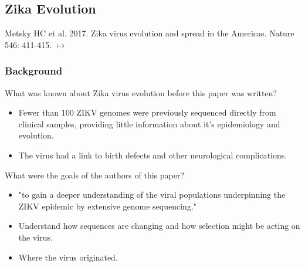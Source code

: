 \documentclass[12pt,a4paper]{article}
\begin{document}
\subsection{Zika Evolution}
{\color{darklc} Metsky HC et al. 2017. Zika virus evolution and spread in the Americas. Nature 546: 411-415. $\mapsto$}
\subsubsection{Background}
\begin{itemize}
    {\color{G-Moon}\item What was known about Zika virus evolution before this paper was written?}
        \begin{itemize}
            \item Fewer than 100 ZIKV genomes were previously sequenced directly from clinical samples, providing little information about it's epidemiology and evolution.
            \item The virus had a link to birth defects and other neurological complications.
        \end{itemize}
    {\color{G-Moon}\item What were the goals of the authors of this paper?}
        \begin{itemize}
            \item "to gain a deeper understanding of the viral populations underpinning the ZIKV epidemic by extensive genome sequencing."
            \item Understand how sequences are changing and how selection might be acting on the virus.
            \item Where the virus originated.
        \end{itemize}
\end{itemize}
\end{document}
